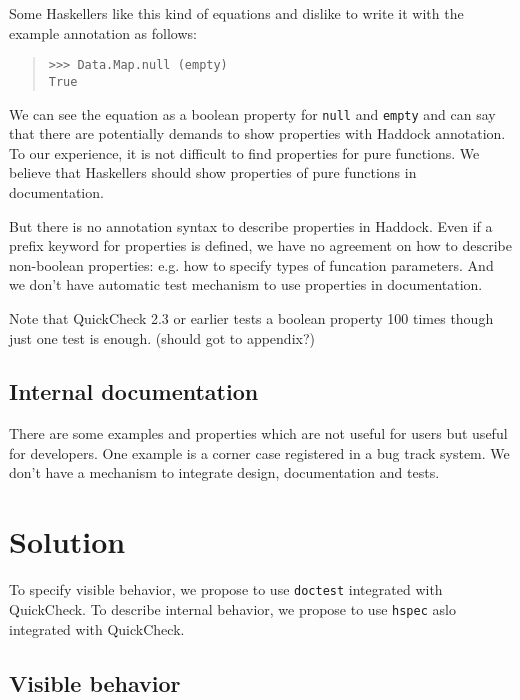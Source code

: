 \documentclass[preprint]{sigplanconf}
\begin{document}
\noindent Some Haskellers like this kind of equations and dislike to write it with the example annotation as follows:

\begin{quote}
\begin{verbatim}
>>> Data.Map.null (empty)
True
\end{verbatim}
\end{quote}

We can see the equation as a boolean property for {\tt null} and {\tt empty} and
can say that there are potentially demands to show properties with Haddock annotation.
To our experience, it is not difficult to find properties for pure functions.
We believe that Haskellers should show properties of pure functions
in documentation.

But there is no annotation syntax to describe properties in Haddock.
Even if a prefix keyword for properties is defined, 
we have no agreement on how to describe non-boolean properties: e.g. how to specify types of funcation parameters. And we don't have automatic test mechanism to use properties in documentation.

Note that QuickCheck 2.3 or earlier tests a boolean property 100 times though just one test is enough. (should got to appendix?)

\subsection{Internal documentation}

There are some examples and properties which are not useful for users but useful for developers. One example is a corner case registered in a bug track system. We don't have a mechanism to integrate design, documentation and tests.

\section{Solution}

To specify visible behavior, we propose to use {\tt doctest} integrated with QuickCheck. To describe internal behavior, we propose to use {\tt hspec} aslo integrated with QuickCheck.

\subsection{Visible behavior}
\end{document}
